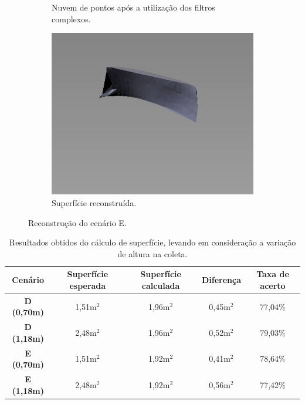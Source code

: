 \begin{figure}[H]
\begin{subfigure}[t]{0.327\textwidth}
        \caption{Nuvem de pontos após a utilização dos filtros complexos.}
    \end{subfigure}
    \begin{subfigure}[t]{0.327\textwidth}
        \includegraphics[width=\textwidth]{dados/figuras/longe_surface.png}
        \caption{Superfície reconstruída.}
    \end{subfigure}
    \caption{Reconstrução do cenário E.}
    \label{fig:resultado_cenario_e}
\end{figure}


\begin{table}[H]
    \centering
    \begin{tabular}{@{}ccccc@{}}
        \toprule
        \multicolumn{1}{c}{\textbf{Cenário}} & \textbf{Superfície esperada} & \textbf{Superfície calculada} & \textbf{Diferença} & \textbf{Taxa de acerto} \\ \midrule
        \textbf{D (0,70m)} & 1,51m$^2$ & 1,96m$^2$ & 0,45m$^2$ & 77,04\% \\
        \textbf{D (1,18m)} & 2,48m$^2$ & 1,96m$^2$ & 0,52m$^2$ & 79,03\% \\
        \textbf{E (0,70m)} & 1,51m$^2$ & 1,92m$^2$ & 0,41m$^2$ & 78,64\% \\
        \textbf{E (1,18m)} & 2,48m$^2$ & 1,92m$^2$ & 0,56m$^2$ & 77,42\% \\
        \bottomrule
    \end{tabular}
    \caption{Resultados obtidos do cálculo de superfície, levando em consideração a variação de altura na coleta.}
    \label{tab:result_inloco_sup}
\end{table}


